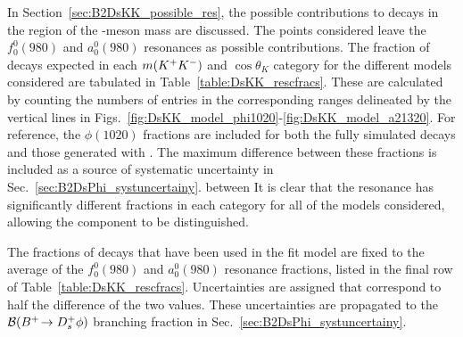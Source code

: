 


In Section~\ref{sec:B2DsKK_possible_res}, the possible contributions to \decay{\Bp}{\Dsp\Kp\Km} decays in the region of the \phiz-meson mass are discussed. The points considered leave the $f_{0}^{0}(980)$ and $a_{0}^{0}(980)$ resonances as possible contributions. 
The fraction of decays expected in each $m({{K}^+}{{K}^-})$ and $\cos\theta_{K}$ category for the different models considered are tabulated in Table~\ref{table:DsKK_rescfracs}. These are calculated by counting the numbers of entries in the corresponding ranges delineated by the vertical lines in Figs.~\ref{fig:DsKK_model_phi1020}-\ref{fig:DsKK_model_a21320}. For reference, the $\phi(1020)$ fractions are included for both the fully simulated decays and those generated with \laurapp. The maximum difference between these fractions is included as a source of systematic uncertainty in Sec.~\ref{sec:B2DsPhi_systuncertainy}.
between It is clear that the \phiz resonance has significantly different fractions in each category for all of the models considered, allowing the component to be distinguished.   



The fractions of \decay{\Bp}{\Dsp\Kp\Km} decays that have been used in the fit model are fixed to the average of the $f_{0}^{0}(980)$ and $a_{0}^{0}(980)$ resonance fractions, listed in the final row of Table~\ref{table:DsKK_rescfracs}. Uncertainties are assigned that correspond to half the difference of the two values. These uncertainties are propagated to the ${\mathcal{B}}({{{B}^+}}\!\rightarrow {\ensuremath{{D}^+_{s}}}\phi)$ branching fraction in Sec.~\ref{sec:B2DsPhi_systuncertainy}. 


